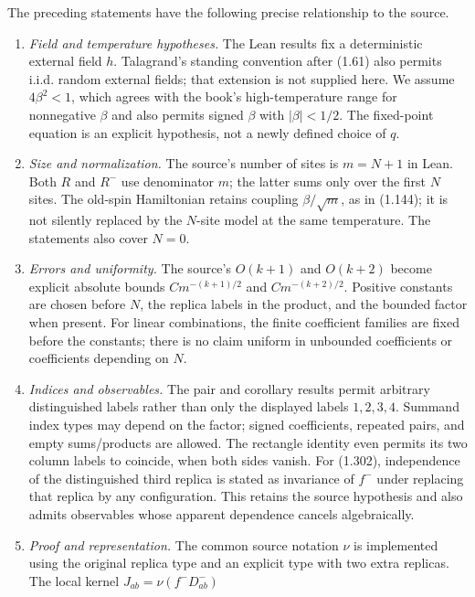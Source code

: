 \begin{remark}
\label{rem:sg-tal:dev-110-cavity}
The preceding statements have the following precise relationship to the source.
\begin{enumerate}
\item \emph{Field and temperature hypotheses.}
The Lean results fix a deterministic external field $h$. Talagrand's standing convention
after (1.61) also permits i.i.d. random external fields; that extension is not supplied here.
We assume $4\beta^2<1$, which agrees with the book's high-temperature range for
nonnegative $\beta$ and also permits signed $\beta$ with $|\beta|<1/2$.
The fixed-point equation is an explicit hypothesis, not a newly defined choice of $q$.
\item \emph{Size and normalization.}
The source's number of sites is $m=N+1$ in Lean. Both $R$ and $R^-$ use denominator $m$;
the latter sums only over the first $N$ sites. The old-spin Hamiltonian retains coupling
$\beta/\sqrt m$, as in (1.144); it is not silently replaced by the $N$-site model at
the same temperature. The statements also cover $N=0$.
\item \emph{Errors and uniformity.}
The source's $O(k+1)$ and $O(k+2)$ become explicit absolute bounds
$C m^{-(k+1)/2}$ and $C m^{-(k+2)/2}$. Positive constants are chosen before $N$,
the replica labels in the product, and the bounded factor when present.
For linear combinations, the finite coefficient families are fixed before the constants;
there is no claim uniform in unbounded coefficients or coefficients depending on $N$.
\item \emph{Indices and observables.}
The pair and corollary results permit arbitrary distinguished labels rather than only
the displayed labels $1,2,3,4$. Summand index types may depend on the factor;
signed coefficients, repeated pairs, and empty sums/products are allowed.
The rectangle identity even permits its two column labels to coincide, when both sides vanish.
For (1.302), independence of the distinguished third replica is stated as invariance of
$f^-$ under replacing that replica by any configuration. This retains the source hypothesis
and also admits observables whose apparent dependence cancels algebraically.
\item \emph{Proof and representation.}
The common source notation $\nu$ is implemented using the original replica type and
an explicit type with two extra replicas. The local kernel $J_{ab}=\nu(f^-D^-_{ab})$

\end{enumerate}
\end{remark}
